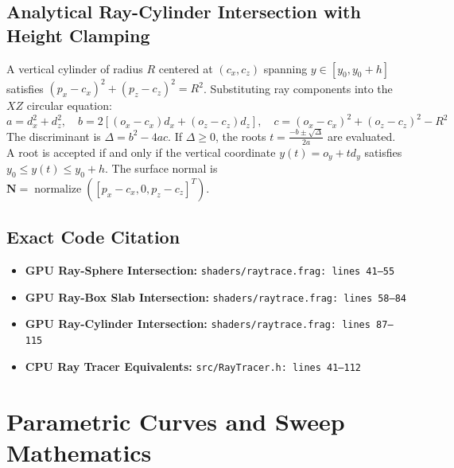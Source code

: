 \subsection{Analytical Ray-Cylinder Intersection with Height Clamping}
A vertical cylinder of radius $R$ centered at $(c_x, c_z)$ spanning $y \in [y_0, y_0 + h]$ satisfies $(p_x - c_x)^2 + (p_z - c_z)^2 = R^2$. Substituting ray components into the $XZ$ circular equation:
\begin{equation}
a = d_x^2 + d_z^2, \quad b = 2\left[(o_x - c_x)d_x + (o_z - c_z)d_z\right], \quad c = (o_x - c_x)^2 + (o_z - c_z)^2 - R^2
\end{equation}
The discriminant is $\Delta = b^2 - 4ac$. If $\Delta \ge 0$, the roots $t = \frac{-b \pm \sqrt{\Delta}}{2a}$ are evaluated. A root is accepted if and only if the vertical coordinate $y(t) = o_y + t d_y$ satisfies $y_0 \le y(t) \le y_0 + h$. The surface normal is $\mathbf{N} = \operatorname{normalize}([p_x - c_x, 0, p_z - c_z]^T)$.

\subsection{Exact Code Citation}
\begin{itemize}
    \item \textbf{GPU Ray-Sphere Intersection:} \texttt{shaders/raytrace.frag: lines 41--55}
    \item \textbf{GPU Ray-Box Slab Intersection:} \texttt{shaders/raytrace.frag: lines 58--84}
    \item \textbf{GPU Ray-Cylinder Intersection:} \texttt{shaders/raytrace.frag: lines 87--115}
    \item \textbf{CPU Ray Tracer Equivalents:} \texttt{src/RayTracer.h: lines 41--112}
\end{itemize}

\section{Parametric Curves and Sweep Mathematics}
